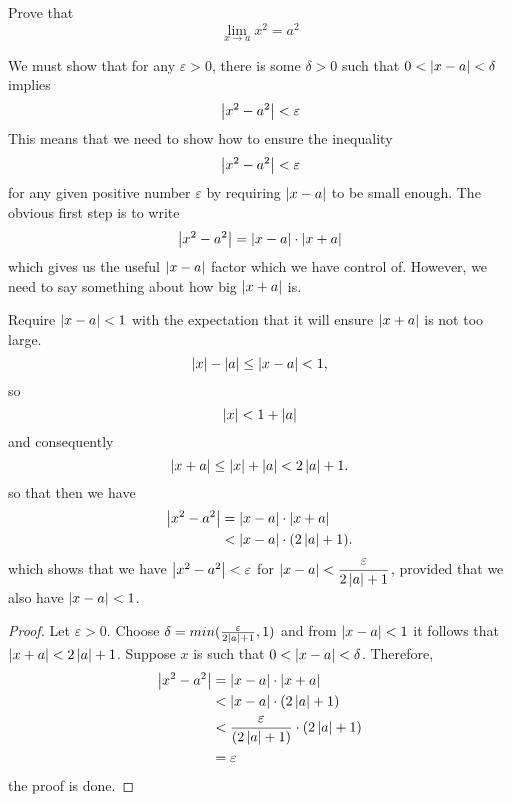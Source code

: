  \begin{eg}
      Prove that
      \begin{equation*}
          \lim_{x \to a} x^2 = a^2
      \end{equation*}
 \end{eg}
 \begin{aim}
      We must show that for any $\varepsilon > 0$, there is some $\delta>0$ such
      that $0<\left\lvert x-a\right\rvert<\delta$ implies
      \begin{equation*}
          \left\lvert x^2-a^2\right\rvert<\varepsilon
      \end{equation*}
      This means that we need to show how to ensure the inequality
      \begin{equation*}
          \left\lvert x^2-a^2\right\rvert<\varepsilon
      \end{equation*}
      for any given positive number $\varepsilon$ by requiring $\left\lvert x-a\right\rvert$ to be
small enough. The obvious first step is to write
      \begin{equation*}
          \left\lvert x^2-a^2\right\rvert = \left\lvert x-a\right\rvert\cdot\left\lvert x+a\right\rvert
      \end{equation*}
      which gives us the useful $\left\lvert x-a\right\rvert$ factor which we have control of.
      However, we need to say something about how big $\left\lvert x+a\right\rvert$ is.

      Require $\left\lvert x-a\right\rvert<1$ with the expectation that it will ensure $\left\lvert x+a\right\rvert$
      is not too large.
      \begin{equation*}
          \left\lvert x\right\rvert-\left\lvert a\right\rvert \leq \left\lvert x-a\right\rvert <1,
      \end{equation*}
      so
      \begin{equation*}
          \left\lvert x\right\rvert <1+\left\lvert a\right\rvert
      \end{equation*}
      and consequently
      \begin{equation*}
          \left\lvert x+a\right\rvert \leq \left\lvert x\right\rvert+\left\lvert a\right\rvert<2\left\lvert a\right\rvert+1.
      \end{equation*}
      so that then we have 
      \begin{align*}
          \left\lvert x^2-a^2\right\rvert &=\left\lvert x-a\right\rvert\cdot\left\lvert x+a\right\rvert\\
          &< \left\lvert x-a\right\rvert\cdot(2\left\lvert a\right\rvert+1).
      \end{align*}
      which shows that we have $\left\lvert x^2-a^2\right\rvert<\varepsilon$ for
      $\left\lvert x-a\right\rvert<\dfrac{\varepsilon}{2\left\lvert a\right\rvert+1}$, provided that we also have
      $\left\lvert x-a\right\rvert<1$.
 \end{aim}
\begin{proof}
     Let $\varepsilon>0$. Choose $\delta = min(\tfrac{\varepsilon}{2\left\lvert a\right\rvert+1},
     1)$ and from $\left\lvert x-a\right\rvert<1$ it follows that $\left\lvert x+a\right\rvert < 2\left\lvert a\right\rvert+1$.
     Suppose $x$ is such that $0<\left\lvert x-a\right\rvert<\delta$. Therefore,
     \begin{align*}
        \left\lvert x^2-a^2\right\rvert &= \left\lvert x-a\right\rvert\cdot \left\lvert x+a\right\rvert\\
        &< \left\lvert x-a\right\rvert\cdot(2\left\lvert a\right\rvert+1)\\
        &< \dfrac{\varepsilon}{(2\left\lvert a\right\rvert+1)} \cdot (2\left\lvert a\right\rvert+1)\\
        &= \varepsilon
     \end{align*}
     the proof is done.
\end{proof}
